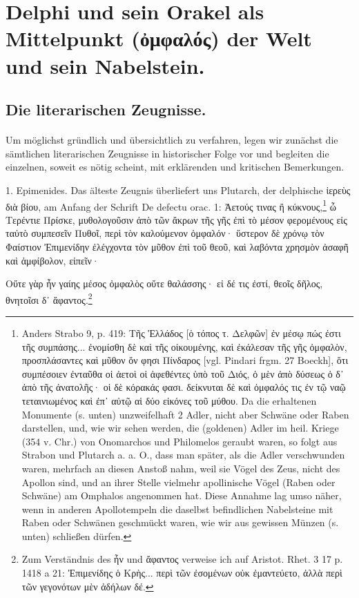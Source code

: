 \documentclass[a4paper, 11pt, oneside]{article}
\begin{document}
\section{Delphi und sein Orakel als Mittelpunkt (ὀμφαλός) der Welt und sein Nabelstein.}
\subsection{Die literarischen Zeugnisse.}
\paragraph{}
Um möglichst gründlich und übersichtlich zu verfahren, legen wir zunächst die sämtlichen literarischen Zeugnisse in historischer Folge vor und begleiten die einzelnen, soweit es nötig scheint, mit erklärenden und kritischen Bemerkungen.

1. Epimenides. Das älteste Zeugnis überliefert uns Plutarch, der delphische ἱερεὺς διὰ βίου, am Anfang der Schrift De defectu orac. 1: Ἀετούς τινας ἢ κύκνους,\footnote{Anders Strabo 9, p. 419: Τῆς Ἑλλάδος [ὁ τόπος τ. Δελφῶν] ἐν μέσῳ πώς ἐστι τῆς συμπάσης... ἐνομίσθη δὲ καὶ τῆς οἰκουμένης, καὶ ἐκάλεσαν τῆς γῆς ὀμφαλὸν, προσπλάσαντες καὶ μῦθον ὅν φησι Πίνδαρος [vgl. Pindari frgm. 27 Boeckh], ὅτι συμπέσοιεν ἐνταῦθα οἱ ἀετοὶ οἱ ἀφεθέντες ὑπὸ τοῦ Διός, ὁ μὲν ἀπὸ δύσεως ὁ δ᾽ ἀπὸ τῆς ἀνατολῆς· οἱ δὲ κόρακάς φασι. δείκνυται δὲ καὶ ὀμφαλός τις ἐν τῷ ναῷ τεταινιωμένος καὶ ἐπ᾽ αὐτῷ αἱ δύο εἰκόνες τοῦ μύθου. Da die erhaltenen Monumente (s. unten) unzweifelhaft 2 Adler, nicht aber Schwäne oder Raben darstellen, und, wie wir sehen werden, die (goldenen) Adler im heil. Kriege (354 v. Chr.) von Onomarchos und Philomelos geraubt waren, so folgt aus Strabon und Plutarch a. a. O., dass man später, als die Adler verschwunden waren, mehrfach an diesen Anstoß nahm, weil sie Vögel des Zeus, nicht des Apollon sind, und an ihrer Stelle vielmehr apollinische Vögel (Raben oder Schwäne) am Omphalos angenommen hat. Diese Annahme lag umso näher, wenn in anderen Apollotempeln die daselbst befindlichen Nabelsteine mit Raben oder Schwänen geschmückt waren, wie wir aus gewissen Münzen (s. unten) schließen dürfen.} ὦ Τερέντιε Πρίσκε, μυθολογοῦσιν ἀπὸ τῶν ἄκρων τῆς γῆς ἐπὶ τὸ μέσον φερομένους εἰς ταὐτὸ συμπεσεῖν Πυθοῖ, περὶ τὸν καλούμενον ὀμφαλόν· ὕστερον δὲ χρόνῳ τὸν Φαίστιον Ἐπιμενίδην ἐλέγχοντα τὸν μῦθον ἐπὶ τοῦ θεοῦ, καὶ λαβόντα χρησμὸν ἀσαφῆ καὶ ἀμφίβολον, εἰπεῖν·

Οὔτε γὰρ ἦν γαίης μέσος ὀμφαλὸς οὔτε θαλάσσης·  
εἰ δέ τις ἐστί, θεοῖς δῆλος, θνητοῖσι δ᾽ ἄφαντος.\footnote{Zum Verständnis des ἦν und ἄφαντος verweise ich auf Aristot. Rhet. 3 17 p. 1418 a 21: Ἐπιμενίδης ὁ Κρὴς... περὶ τῶν ἐσομένων οὐκ ἐμαντεύετο, ἀλλὰ περὶ τῶν γεγονότων μὲν ἀδήλων δέ.}
\end{document}
